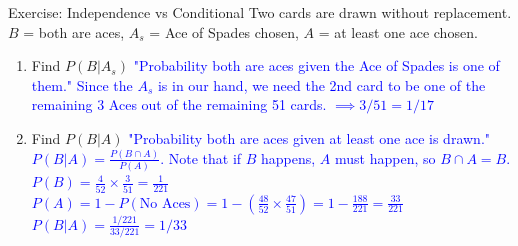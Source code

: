 \documentclass[aspectratio=169]{beamer}
\begin{document}
\begin{frame}{Exercise: Independence vs Conditional}
    Two cards are drawn without replacement. 
    $B$ = both are aces, $A_s$ = Ace of Spades chosen, $A$ = at least one ace chosen.
    
    \vspace{0.2cm}
    \begin{enumerate}
        \item Find $P(B|A_s)$ \pause
        \newline \textcolor{blue}{"Probability both are aces given the Ace of Spades is one of them."}
        \newline \textcolor{blue}{Since the $A_s$ is in our hand, we need the 2nd card to be one of the remaining 3 Aces out of the remaining 51 cards. $\implies 3/51 = 1/17$} \pause
        
        \vspace{0.2cm}
        \item Find $P(B|A)$ \pause
        \newline \textcolor{blue}{"Probability both are aces given at least one ace is drawn."}
        \newline \textcolor{blue}{$P(B|A) = \frac{P(B \cap A)}{P(A)}$. Note that if $B$ happens, $A$ must happen, so $B \cap A = B$.}
        \newline \textcolor{blue}{$P(B) = \frac{4}{52} \times \frac{3}{51} = \frac{1}{221}$}
        \newline \textcolor{blue}{$P(A) = 1 - P(\text{No Aces}) = 1 - \left(\frac{48}{52} \times \frac{47}{51}\right) = 1 - \frac{188}{221} = \frac{33}{221}$}
        \newline \textcolor{blue}{$P(B|A) = \frac{1/221}{33/221} = 1/33$}
    \end{enumerate}
\end{frame}
\end{document}
